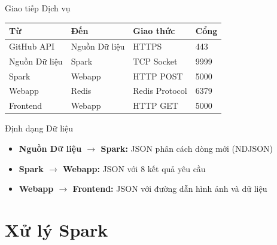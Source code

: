 \documentclass[aspectratio=169]{beamer}
\begin{document}
\begin{frame}{Giao tiếp Dịch vụ}
    \begin{table}[h]
        \centering
        \small
        \begin{tabular}{llll}
            \toprule
            \textbf{Từ} & \textbf{Đến} & \textbf{Giao thức} & \textbf{Cổng} \\
            \midrule
            GitHub API & Nguồn Dữ liệu & HTTPS & 443 \\
            Nguồn Dữ liệu & Spark & TCP Socket & 9999 \\
            Spark & Webapp & HTTP POST & 5000 \\
            Webapp & Redis & Redis Protocol & 6379 \\
            Frontend & Webapp & HTTP GET & 5000 \\
            \bottomrule
        \end{tabular}
    \end{table}
    
    \vspace{0.3cm}
    \begin{block}{Định dạng Dữ liệu}
        \begin{itemize}
            \item \textbf{Nguồn Dữ liệu $\rightarrow$ Spark:} JSON phân cách dòng mới (NDJSON)
            \item \textbf{Spark $\rightarrow$ Webapp:} JSON với 8 kết quả yêu cầu
            \item \textbf{Webapp $\rightarrow$ Frontend:} JSON với đường dẫn hình ảnh và dữ liệu
        \end{itemize}
    \end{block}
\end{frame}

\section{Xử lý Spark}
\end{document}
